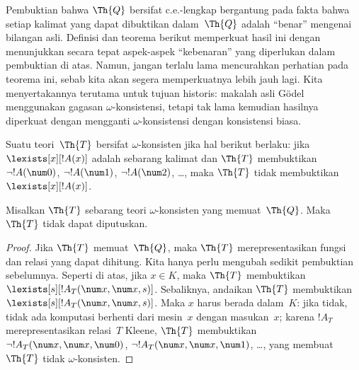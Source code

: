 \documentclass[../../../include/open-logic-section]{subfiles}
\begin{document}


\begin{explain}
Pembuktian bahwa $\Th{Q}$ bersifat c.e.-lengkap bergantung pada fakta bahwa
setiap kalimat yang dapat dibuktikan dalam~$\Th{Q}$ adalah ``benar'' mengenai
bilangan asli. Definisi dan teorema berikut memperkuat hasil ini dengan
menunjukkan secara tepat aspek-aspek ``kebenaran'' yang diperlukan dalam
pembuktian di atas. Namun, jangan terlalu lama mencurahkan perhatian pada
teorema ini, sebab kita akan segera memperkuatnya lebih jauh lagi. Kita
menyertakannya terutama untuk tujuan historis: makalah asli G\"odel
menggunakan gagasan $\omega$-konsistensi, tetapi tak lama kemudian hasilnya
diperkuat dengan mengganti $\omega$-konsistensi dengan konsistensi biasa.
\end{explain}

\begin{defn}
Suatu teori~$\Th{T}$ bersifat $\omega$-konsisten jika hal berikut berlaku:
jika $\lexists[x][!A(x)]$ adalah sebarang kalimat dan $\Th{T}$ membuktikan
$\lnot !A(\num 0)$, $\lnot !A(\num 1)$, $\lnot !A(\num 2)$, \dots, maka
$\Th{T}$ tidak membuktikan $\lexists[x][!A(x)]$.
\end{defn}

\begin{thm}
  Misalkan $\Th{T}$ sebarang teori $\omega$-konsisten yang memuat~$\Th{Q}$.
  Maka $\Th{T}$ tidak dapat diputuskan.
\end{thm}

\begin{proof}
Jika $\Th{T}$ memuat~$\Th{Q}$, maka $\Th{T}$ merepresentasikan fungsi dan
relasi yang dapat dihitung. Kita hanya perlu mengubah sedikit pembuktian
sebelumnya. Seperti di atas, jika $x \in K$, maka $\Th{T}$ membuktikan
$\lexists[s][!A_T(\num x,\num x, s)]$. Sebaliknya, andaikan $\Th{T}$
membuktikan $\lexists[s][!A_T(\num x, \num x, s)]$. Maka $x$ harus berada
dalam~$K$: jika tidak, tidak ada komputasi berhenti dari mesin~$x$ dengan
masukan~$x$; karena $!A_T$ merepresentasikan relasi~$T$ Kleene, $\Th{T}$
membuktikan $\lnot !A_T(\num x, \num x, \num 0)$, $\lnot !A_T(\num x, \num
x, \num 1)$, \dots, yang membuat $\Th{T}$ tidak $\omega$-konsisten.
\end{proof}
\end{document}
